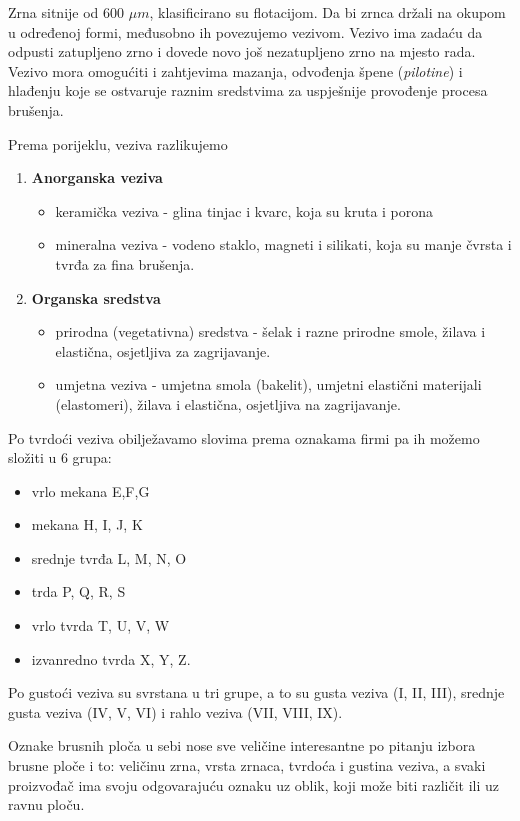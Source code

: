 \documentclass[a4paper,12pt]{article}
\numberwithin{figure}{section}
\begin{document}
Zrna sitnije od 600 $\mu m$, klasificirano su flotacijom. Da bi zrnca držali na okupom u određenoj formi, međusobno ih povezujemo vezivom. Vezivo ima zadaću da odpusti zatupljeno zrno i dovede novo još nezatupljeno zrno na mjesto rada. Vezivo mora omogućiti i zahtjevima mazanja, odvođenja špene (\textit{pilotine}) i hlađenju koje se ostvaruje raznim sredstvima za uspješnije provođenje procesa brušenja. \par
Prema porijeklu, veziva razlikujemo 
\begin{enumerate}
\item \textbf{Anorganska veziva}
\begin{itemize}
\item keramička veziva - glina tinjac i kvarc, koja su kruta i porona
\item mineralna veziva - vodeno staklo, magneti i silikati, koja su manje čvrsta i tvrđa za fina brušenja.
\end{itemize}
\item \textbf{Organska sredstva}
\begin{itemize}
\item prirodna (vegetativna) sredstva - šelak i razne prirodne smole, žilava i elastična, osjetljiva za zagrijavanje.
\item umjetna veziva - umjetna smola (bakelit), umjetni elastični materijali (elastomeri), žilava i elastična, osjetljiva na zagrijavanje.
\end{itemize}
\end{enumerate}
Po tvrdoći veziva obilježavamo slovima prema oznakama firmi pa ih možemo složiti u 6 grupa:
\begin{itemize}
\item vrlo mekana E,F,G
\item mekana H, I, J, K
\item srednje tvrđa L, M, N, O
\item trda P, Q, R, S
\item vrlo tvrda T, U, V, W
\item izvanredno tvrda X, Y, Z.
\end{itemize}
Po gustoći veziva su svrstana u tri grupe, a to su gusta veziva  (I, II, III), srednje gusta veziva (IV, V, VI) i rahlo veziva (VII, VIII, IX).\par
Oznake brusnih ploča u sebi nose sve veličine interesantne po pitanju izbora brusne ploče i to: veličinu zrna, vrsta zrnaca, tvrdoća i gustina veziva, a svaki proizvođač ima svoju odgovarajuću oznaku uz oblik, koji može biti različit ili uz ravnu ploču.
\end{document}
